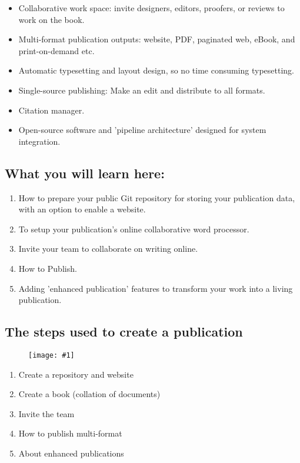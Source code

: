 \documentclass{article}
\newlength{\imgwidth}
\newcommand\scaledgraphics[2]{%
                
\settowidth{\imgwidth}{\texttt{[image: \#1]}}%
                
\setlength{\imgwidth}{\minof{\imgwidth}{#2\textwidth}}%
                
\texttt{[image: \#1]}%
                
}
\begin{document}
\begin{itemize}
\item Collaborative work space: invite designers, editors, proofers, or reviews to work on the book.


\item Multi-format publication outputs: website, PDF, paginated web, eBook, and print-on-demand etc.


\item Automatic typesetting and layout design, so no time consuming typesetting.


\item Single-source publishing: Make an edit and distribute to all formats.


\item Citation manager.


\item Open-source software and 'pipeline architecture' designed for system integration.


\end{itemize}

\subsection{What you will learn here:}\label{H7757657}


\begin{enumerate}
\item How to prepare your public Git repository for storing your publication data, with an option to enable a website.


\item To setup your publication's online collaborative word processor.


\item Invite your team to collaborate on writing online.


\item How to Publish. 


\item Adding 'enhanced publication' features to  transform your work into a living publication.


\end{enumerate}

\subsection{The steps used to create a publication}\label{H3159430}


\begin{figure}
\scaledgraphics{fec439eb-c4d6-4587-a4a2-affde7c45586.png}{0.5}
\label{F18710661}
\end{figure}

\begin{enumerate}
\item Create a repository and website


\item Create a book (collation of documents)


\item Invite the team


\item How to publish multi-format


\item About enhanced publications


\end{enumerate}
\end{document}
